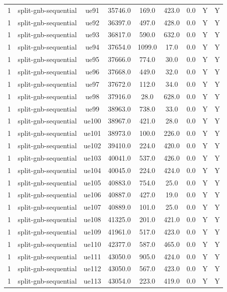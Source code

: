 \begin{table}[ht]
\begin{tabular}{|c|c|c|c|c|c|c|c|c|}
1 & split-gnb-sequential & ue91 & 35746.0 & 169.0 & 423.0 & 0.0 & Y & Y \\
1 & split-gnb-sequential & ue92 & 36397.0 & 497.0 & 428.0 & 0.0 & Y & Y \\
1 & split-gnb-sequential & ue93 & 36817.0 & 590.0 & 632.0 & 0.0 & Y & Y \\
1 & split-gnb-sequential & ue94 & 37654.0 & 1099.0 & 17.0 & 0.0 & Y & Y \\
1 & split-gnb-sequential & ue95 & 37666.0 & 774.0 & 30.0 & 0.0 & Y & Y \\
1 & split-gnb-sequential & ue96 & 37668.0 & 449.0 & 32.0 & 0.0 & Y & Y \\
1 & split-gnb-sequential & ue97 & 37672.0 & 112.0 & 34.0 & 0.0 & Y & Y \\
1 & split-gnb-sequential & ue98 & 37916.0 & 28.0 & 628.0 & 0.0 & Y & Y \\
1 & split-gnb-sequential & ue99 & 38963.0 & 738.0 & 33.0 & 0.0 & Y & Y \\
1 & split-gnb-sequential & ue100 & 38967.0 & 421.0 & 28.0 & 0.0 & Y & Y \\
1 & split-gnb-sequential & ue101 & 38973.0 & 100.0 & 226.0 & 0.0 & Y & Y \\
1 & split-gnb-sequential & ue102 & 39410.0 & 224.0 & 420.0 & 0.0 & Y & Y \\
1 & split-gnb-sequential & ue103 & 40041.0 & 537.0 & 426.0 & 0.0 & Y & Y \\
1 & split-gnb-sequential & ue104 & 40045.0 & 224.0 & 424.0 & 0.0 & Y & Y \\
1 & split-gnb-sequential & ue105 & 40883.0 & 754.0 & 25.0 & 0.0 & Y & Y \\
1 & split-gnb-sequential & ue106 & 40887.0 & 427.0 & 19.0 & 0.0 & Y & Y \\
1 & split-gnb-sequential & ue107 & 40889.0 & 101.0 & 25.0 & 0.0 & Y & Y \\
1 & split-gnb-sequential & ue108 & 41325.0 & 201.0 & 421.0 & 0.0 & Y & Y \\
1 & split-gnb-sequential & ue109 & 41961.0 & 517.0 & 423.0 & 0.0 & Y & Y \\
1 & split-gnb-sequential & ue110 & 42377.0 & 587.0 & 465.0 & 0.0 & Y & Y \\
1 & split-gnb-sequential & ue111 & 43050.0 & 905.0 & 424.0 & 0.0 & Y & Y \\
1 & split-gnb-sequential & ue112 & 43050.0 & 567.0 & 423.0 & 0.0 & Y & Y \\
1 & split-gnb-sequential & ue113 & 43054.0 & 223.0 & 419.0 & 0.0 & Y & Y \\

\end{tabular}
\end{table}
